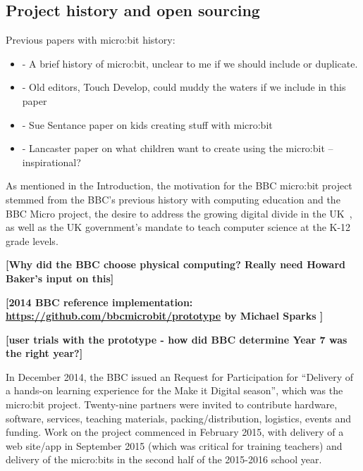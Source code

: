


\subsection{Project history and open sourcing}


Previous papers with micro:bit history:

\begin{itemize}
    \item \cite{rogers2017bbc} - A brief history of micro:bit, unclear to me if we should include or duplicate.
    \item \cite{ball2016microsoft} - Old editors, Touch Develop, could muddy the waters if we include in this paper
    \item \cite{sentance2017creating} - Sue Sentance paper on kids creating stuff with micro:bit
    \item \cite{knowles2018children} - Lancaster paper on what children want to create using the micro:bit -- inspirational?
\end{itemize}

As mentioned in the Introduction, the motivation for the BBC micro:bit project
stemmed from the BBC's previous history with computing education and the BBC Micro
project, the desire to address the growing digital divide in the UK~\cite{XYZ},
as well as the UK government's mandate to teach computer science at the K-12 grade levels.

{\bf [Why did the BBC choose physical computing? Really need Howard Baker's input on this]}

{\bf [2014 BBC reference implementation: \url{https://github.com/bbcmicrobit/prototype}
by Michael Sparks ]}

{\bf [user trials with the prototype - how did BBC determine Year 7 was the right year?] }

In December 2014, the BBC issued an Request for Participation
for ``Delivery of a hands-on learning experience for the Make it Digital season'',
which was the micro:bit project.
Twenty-nine partners were invited to contribute hardware, software, services,
teaching materials, packing/distribution, logistics, events and funding.
Work on the project commenced in February 2015, with delivery of
a web site/app in September 2015 (which was critical
for training teachers) and delivery of the micro:bits in the second
half of the 2015-2016 school year.

